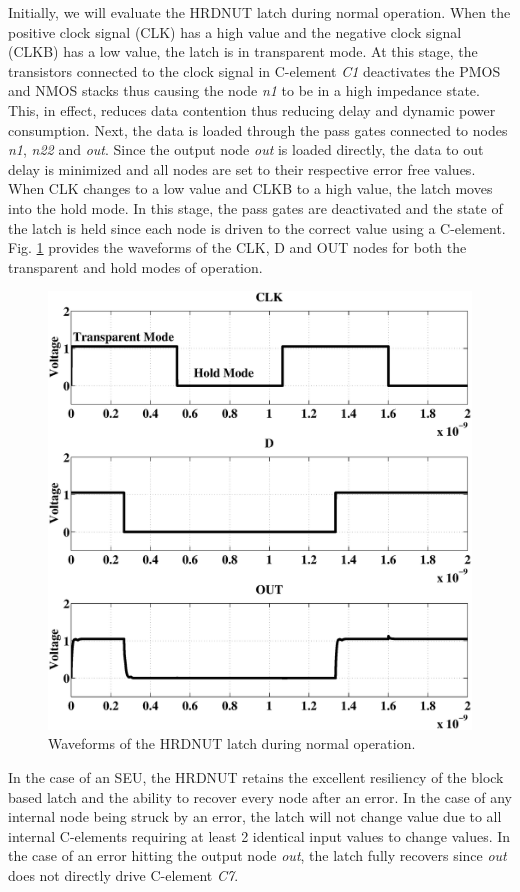 Initially, we will evaluate the HRDNUT latch during normal operation. When the positive clock signal (CLK) has a high value and the negative clock signal (CLKB) has a low value, the latch is in transparent mode. At this stage, the transistors connected to the clock signal in C-element \textit{C1} deactivates the PMOS and NMOS stacks thus causing the node \textit{n1} to be in a high impedance state. This, in effect, reduces data contention thus reducing delay and dynamic power consumption. Next, the data is loaded through the pass gates connected to nodes \textit{n1}, \textit{n22} and \textit{out}. Since the output node \textit{out} is loaded directly, the data to out delay is minimized and all nodes are set to their respective error free values. When CLK changes to a low value and CLKB to a high value, the latch moves into the hold mode. In this stage, the pass gates are deactivated and the state of the latch is held since each node is driven to the correct value using a C-element. Fig. \ref{NormOp} provides the waveforms of the CLK, D and OUT nodes for both the transparent and hold modes of operation.

\begin{figure}[!htbp]
	\centering
	\includegraphics[width=0.65\linewidth]{Figures/defaultoperation.eps}
	\caption{Waveforms of the HRDNUT latch during normal operation.}
	\label{NormOp}
\end{figure}

In the case of an SEU, the HRDNUT retains the excellent resiliency of the block based latch and the ability to recover every node after an error. In the case of any internal node being struck by an error, the latch will not change value due to all internal C-elements requiring at least 2 identical input values to change values. In the case of an error hitting the output node \textit{out}, the latch fully recovers since \textit{out} does not directly drive C-element \textit{C7}.

